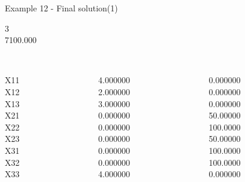 \begin{frame}{Example 12 - Final solution(1)}

\footnotesize
{}  3\\
  7100.000\\

\begin{columns}[t]
\begin{column}{0.3\textwidth}
\\
X11\\
X12\\
X13\\
X21\\
X22\\
X23\\
X31\\
X32\\
X33\\
\end{column}
\begin{column}{0.3\textwidth}
\\
4.000000\\
2.000000\\
3.000000\\
0.000000\\
0.000000\\
0.000000\\
0.000000\\
0.000000\\
4.000000\\

\end{column}  

\begin{column}{0.3\textwidth}
\\
0.000000\\
0.000000\\
0.000000\\
50.00000\\
100.0000\\
50.00000\\
100.0000\\
100.0000\\
0.000000\\
\end{column}
\end{columns}  
\end{frame}


